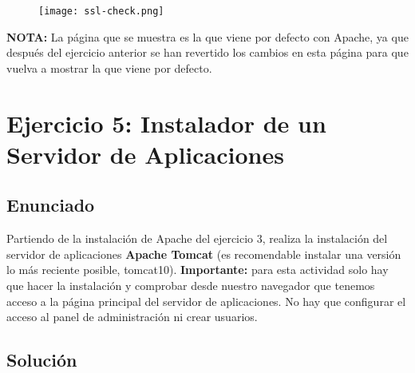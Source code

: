 \begin{enumerate}
    \begin{figure}[H]
        \centering
        \texttt{[image: ssl-check.png]}
    \end{figure}

    \textbf{NOTA:} La página que se muestra es la que viene por defecto con Apache, ya que después del ejercicio anterior se han revertido los cambios en esta página para que vuelva a mostrar la que viene por defecto.
\end{enumerate}

\section{Ejercicio 5: Instalador de un Servidor de Aplicaciones}
\subsection{Enunciado}
Partiendo de la instalación de Apache del ejercicio 3, realiza la instalación del servidor de aplicaciones \textbf{Apache Tomcat} (es recomendable instalar una versión lo más reciente posible, tomcat10). \textbf{Importante:} para esta actividad solo hay que hacer la instalación y comprobar desde nuestro navegador que tenemos acceso a la página principal del servidor de aplicaciones. No hay que configurar el acceso al panel de administración ni crear usuarios.

\subsection{Solución}






%
%


